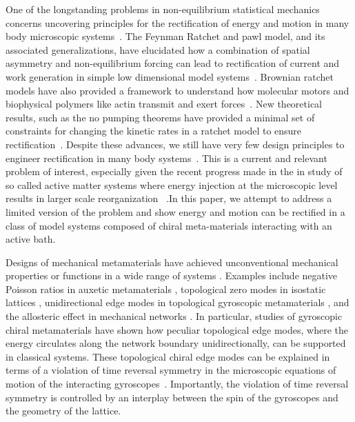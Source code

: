 \documentclass[
 preprint,
 preprintnumbers,
 amsmath,amssymb,
 aps,
 pre,
 longbibliography,
 superscriptaddress,
 10pt, twocolumn
]{revtex4-1}
\begin{document}
One of the longstanding problems in non-equilibrium statistical mechanics concerns uncovering principles for the rectification of energy and motion in many body microscopic systems~\cite{seifert2012stochastic,coskun2012great}. The Feynman Ratchet and pawl model, and its associated generalizations, have elucidated how a combination of spatial asymmetry and non-equilibrium forcing can lead to rectification of current and work generation in simple low dimensional model systems~\cite{jarzynski1999feynman}. Brownian ratchet models have also provided a framework to understand how molecular motors and biophysical polymers like actin transmit and exert forces~\cite{mogilner1996cell}. New theoretical results, such as the no pumping theorems have provided a minimal set of constraints for changing the kinetic rates in a ratchet model to ensure rectification~\cite{Chernyak2008,Rahav2008,Sinitsyn2007}. Despite these advances, we still have very few design principles to engineer rectification in many body systems~\cite{seifert2012stochastic}. This is a current and relevant problem of interest, especially given the recent progress made in the in study of so called active matter systems where energy injection at the microscopic level results in larger scale reorganization ~\cite{marchetti2013hydrodynamics,souslov2017topological,Shankar2017}.In this paper, we attempt to address a limited version of the problem and show energy and motion can be rectified in a class of model systems composed of chiral meta-materials interacting with an active bath.

Designs of mechanical metamaterials have achieved unconventional mechanical properties or functions in a wide range of systems \cite{Bertoldi2017FlexibleMechanical}. Examples include negative Poisson ratios in auxetic metamaterials \cite{Lakes2017NegativePoissonSRatio,Ren2018AuxeticMetamaterials}, topological zero modes in isostatic lattices \cite{Kane2013TopologicalBoundary,Lubensky2015PhononsElasticity,Paulose2015SelectiveBuckling}, unidirectional edge modes in topological gyroscopic metamaterials \cite{Nash2015TopologicalMechanics,Wang2015TopologicalPhononic,Mitchell2018AmorphousTopological}, and the allosteric effect in mechanical networks \cite{Rocks2017DesigningAllosteryinspired,Yan2017ArchitectureCoevolution,Flechsig2017DesignElastic}. In particular, studies of gyroscopic chiral metamaterials have shown how peculiar topological edge modes, where the energy circulates along the network boundary unidirectionally, can be supported in classical systems\cite{Nash2015TopologicalMechanics}. These topological chiral edge modes can be explained in terms of a violation of time reversal symmetry in the microscopic equations of motion of the interacting gyroscopes~\cite{Nash2015TopologicalMechanics,Mitchell2018AmorphousTopological}. Importantly, the violation of time reversal symmetry is controlled by an interplay between the spin of the gyroscopes and the geometry of the lattice.
\end{document}
